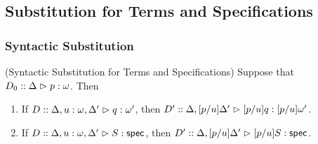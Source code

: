 \subsection{Substitution for Terms and Specifications}

\subsubsection{Syntactic Substitution}

\begin{lemma}{(Syntactic Substitution for Terms and Specifications)}
Suppose that $D_0 :: \judgeA{p}{\omega}$. Then
\begin{enumerate}
\item If $D :: \judgeA[{\Delta, u:\omega, \Delta'}]{q}{\omega'}$, then 
         $D' :: \judgeA[{\Delta, [p/u]\Delta'}]{[p/u]q}{[p/u]\omega'}$. 
\item If $D :: \judgeS[{\Delta, u:\omega, \Delta'}]{S}$, then 
         $D' :: \judgeS[{\Delta, [p/u]\Delta'}]{[p/u]S}$. 
\end{enumerate}
\end{lemma}
